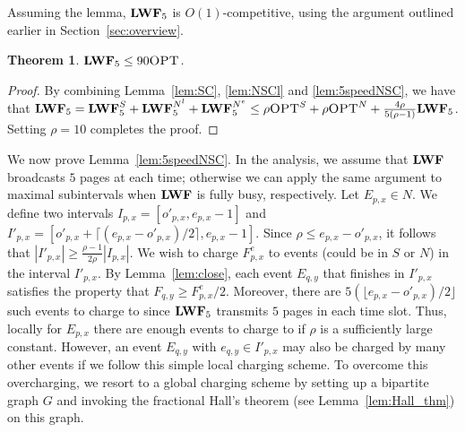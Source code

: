 \documentclass[11pt]{article}
\newtheorem{theorem}[lemma]{Theorem}
\newcommand{\opt}{\textrm{\sc OPT}}
\newcommand{\len}{\mathfrak{\rho}}
\newcommand{\floor}[1]{\lfloor #1 \rfloor}
\newcommand{\ceil}[1]{\lceil #1 \rceil}
\newcommand{\fe}{F^e}
\newcommand{\lwfs}{\lwf^{S}}
\newcommand{\lwfne}{\lwf^{N^e}}
\newcommand{\lwfnl}{\lwf^{N^l}}
\newcommand{\opts}{\opt^{S}}
\newcommand{\optn}{\opt^{N}}
\begin{document}
\begin{titlepage}
Assuming the lemma, ${\texttt{\bf{LWF}}}_5$ is $O(1)$-competitive, using the argument
outlined earlier in Section~\ref{sec:overview}.
\begin{theorem}
  \label{thm:5spd}
    $\lwf_{5} \leq 90 \opt$.
\end{theorem}

\begin{proof}

\iffalse
 Set $\len = 20$ and combine Lemma~\ref{lem:SC}, \ref{lem:NSCl} and \ref{lem:5speedNSC}.
\begin{eqnarray*}

\lwf_{5} &=&  \lwfs_{5} + \lwfnl_{5} + \lwfne_{5}
&\leq& \len \opts + \len \optn + \frac{4 \len}{5(\len-1)} \lwf_{5} \\
&=& 20 \opt + \frac{8}{9} \lwf_{5}  \\
\Longleftrightarrow \lwf_{5} &\leq& 180 \opt
\end{eqnarray*}
\fi

By combining Lemma~\ref{lem:SC}, \ref{lem:NSCl} and
\ref{lem:5speedNSC}, we have that $\lwf_{5} = \lwfs_{5} + \lwfnl_{5}
+\lwfne_{5} \leq \len \opts + \len \optn + \frac{4 \len}{5(\len-1)}
\lwf_{5}$. Setting $\len = 10$ completes the proof.
\end{proof}

We now prove Lemma~\ref{lem:5speedNSC}. In the analysis, we assume that ${\texttt{\bf{LWF}}}$ broadcasts $5$ pages at each time;
otherwise we can apply the same argument to maximal subintervals when ${\texttt{\bf{LWF}}}$ is fully busy, respectively. 
Let $E_{p,x} \in N$. We define
two intervals $I_{p,x} = [o'_{p,x}, e_{p,x}-1]$ and $I'_{p,x} =
[o'_{p,x}+\ceil{(e_{p,x} - o'_{p,x})/2}, e_{p,x}-1]$.  Since $\rho \le
e_{p,x} - o'_{p,x}$, it follows that $|I'_{p,x}| \ge
\frac{\len-1}{2\len} |I_{p,x}|$.  We wish to charge $\fe_{p,x}$ to
events (could be in $S$ or $N$) in the interval $I'_{p,x}$. By
Lemma~\ref{lem:close}, each event $E_{q,y}$ that finishes in
$I'_{p,x}$ satisfies the property that $F_{q,y} \ge
\fe_{p,x}/2$. Moreover, there are $5(\floor{e_{p,x} - o'_{p,x})/2}$
such events to charge to since ${\texttt{\bf{LWF}}}_5$ transmits $5$ pages in each
time slot.  Thus, locally for $E_{p,x}$ there are enough events to
charge to if $\len$ is a sufficiently large constant.  However, an
event $E_{q,y}$ with $e_{q,y} \in I'_{p,x}$ may also be charged by
many other events if we follow this simple local charging scheme. To
overcome this overcharging, we resort to a global charging scheme by
setting up a bipartite graph $G$ and invoking the fractional Hall's
theorem (see Lemma~\ref{lem:Hall_thm}) on this graph.


\end{titlepage}
\end{document}
